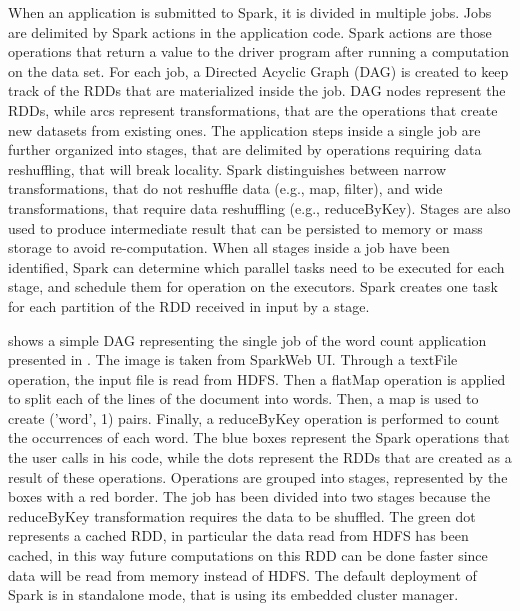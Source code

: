 When an application is submitted to Spark, it is divided in multiple jobs. Jobs are delimited by Spark actions in the application code. Spark actions are those operations that return a value to the driver program after running a computation on the data set.
For each job, a Directed Acyclic Graph (DAG) is created to keep track of the RDDs that are materialized inside the job. DAG nodes represent the RDDs, while arcs represent transformations, that are the operations that create new datasets from existing ones.
The application steps inside a single job are further organized into stages, that are delimited by operations requiring data reshuffling, that will break locality. Spark distinguishes between narrow transformations, that do not reshuffle data (e.g., map, filter), and wide transformations, that require data reshuffling (e.g., reduceByKey). Stages are also used to produce intermediate result that can be persisted to memory or mass storage to avoid re-computation. When all stages inside a job have been identified, Spark can determine which parallel tasks need to be executed for each stage, and schedule them for operation on the executors. Spark creates one task for each partition of the RDD received in input by a stage.



 shows a simple DAG representing the single job of the word count application presented in  \cite{misc:SparkApplication}. The image is taken from SparkWeb UI. Through a textFile operation, the input file is read from HDFS. Then a flatMap operation is applied to split each of the lines of the document into words. Then, a map is used to create (’word’, 1) pairs. Finally, a reduceByKey operation is performed to count the occurrences of each word. The blue boxes represent the Spark operations that the user calls in his code, while the dots represent the RDDs that are created as a result of these operations. Operations are grouped into stages, represented by the boxes with a red border. The job has been divided into two stages because the reduceByKey transformation requires the data to be shuffled. The green dot represents a cached RDD, in particular the data read from HDFS has been cached, in this way future computations on this RDD can be done faster since data will be read from memory instead of HDFS. The default deployment of Spark is in standalone mode, that is using its embedded cluster manager. 

